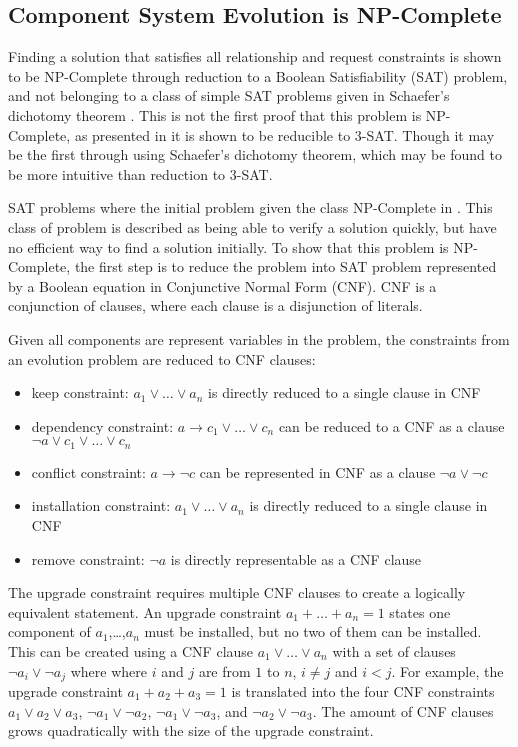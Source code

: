 \subsection{Component System Evolution is NP-Complete}
Finding a solution that satisfies all relationship and request constraints is shown to be NP-Complete through reduction to a Boolean Satisfiability (SAT) problem,
and not belonging to a class of simple SAT problems given in Schaefer's dichotomy theorem \citep{Schaefer1978}.
This is not the first proof that this problem is NP-Complete, as presented in \citep{edos2005report} it is shown to be reducible to 3-SAT. 
Though it may be the first through using Schaefer's dichotomy theorem, which may be found to be more intuitive than reduction to 3-SAT.

SAT problems where the initial problem given the class NP-Complete in \citep{cook1971}.
This class of problem is described as being able to verify a solution quickly, but have no efficient way to find a solution initially.
To show that this problem is NP-Complete, the first step is to reduce the problem into SAT problem represented by a Boolean equation in Conjunctive Normal Form (CNF).
CNF is a conjunction of clauses, where each clause is a disjunction of literals.

Given all components are represent variables in the problem, the constraints from an evolution problem are reduced to CNF clauses:
\begin{itemize}
  \item keep constraint: $a_1 \vee \ldots \vee a_n$ is directly reduced to a single clause in CNF
  \item dependency constraint: $a \rightarrow c_1 \vee \ldots \vee c_n$ can be reduced to a CNF as a clause $\neg a \vee c_1 \vee \ldots \vee c_n$
  \item conflict constraint: $a \rightarrow \neg c$ can be represented in CNF as a clause $\neg a \vee \neg c$
  \item installation constraint: $a_1 \vee \ldots \vee a_n$ is directly reduced to a single clause in CNF
  \item remove constraint: $\neg a$ is directly representable as a CNF clause
\end{itemize}

The upgrade constraint requires multiple CNF clauses to create a logically equivalent statement.
An upgrade constraint $a_1 + \ldots + a_n = 1$ states one component of $a_1$,\ldots,$a_n$ must be installed, but no two of them can be installed.
This can be created using a CNF clause $a_1 \vee \ldots \vee a_n$ with a set of clauses $\neg a_i \vee \neg a_j$ where where $i$ and $j$ are from $1$ to $n$, $i \neq j$ and $i < j$.
For example, the upgrade constraint $a_1 + a_2 + a_3 = 1$ is translated into the four CNF constraints $a_1 \vee a_2 \vee a_3$, $\neg a_1 \vee \neg a_2$, $\neg a_1 \vee \neg a_3$, and $\neg a_2 \vee \neg a_3$.
The amount of CNF clauses grows quadratically with the size of the upgrade constraint. 

